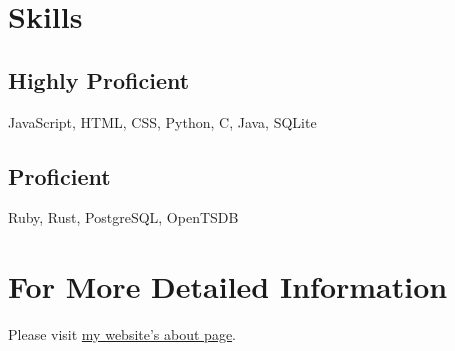 \documentclass{article}
\begin{document}
\section*{Skills}

\subsection*{Highly Proficient}
JavaScript, HTML, CSS, Python, C, Java, SQLite

\subsection*{Proficient}
Ruby, Rust, PostgreSQL, OpenTSDB


\section*{For More Detailed Information}
Please visit \href{http://www.michaelyounkin.com/about.html}{my website's about
page}.

\end{document}
